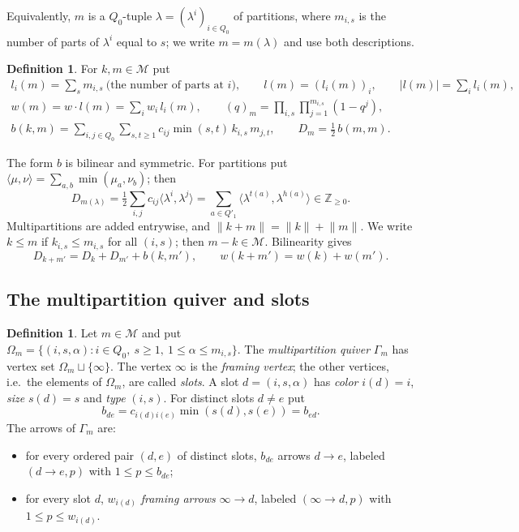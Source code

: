 \documentclass[11pt]{amsart}
\theoremstyle{definition}
\newtheorem{definition}[theorem]{Definition}
\theoremstyle{remark}
\numberwithin{equation}{section}
\newcommand{\Z}{\mathbb{Z}}
\newcommand{\cM}{\mathcal{M}}
\newcommand{\Om}{\Omega_m}
\newcommand{\norm}[1]{\lVert #1\rVert}
\begin{document}
Equivalently, $m$ is a $Q_0$-tuple $\lambda=(\lambda^i)_{i\in Q_0}$ of partitions, where $m_{i,s}$ is the
number of parts of $\lambda^i$ equal to $s$; we write $m=m(\lambda)$ and use both descriptions.

\begin{definition}\label{def:notation}
For $k,m\in\cM$ put
\begin{gather}
  l_i(m)=\textstyle\sum_s m_{i,s}\ \text{(the number of parts at $i$)},\qquad
  l(m)=(l_i(m))_i,\qquad |l(m)|=\textstyle\sum_i l_i(m),\label{eq:l}\\
  w(m)=w\cdot l(m)=\textstyle\sum_i w_i\,l_i(m),\qquad
  (q)_m=\prod_{i,s}\prod_{j=1}^{m_{i,s}}(1-q^j),\label{eq:qm}\\
  b(k,m)=\sum_{i,j\in Q_0}\sum_{s,t\ge1}c_{ij}\min(s,t)\,k_{i,s}\,m_{j,t},\qquad D_m=\tfrac12\,b(m,m).
  \label{eq:b}
\end{gather}
\end{definition}

The form $b$ is bilinear and symmetric. For partitions put $\langle\mu,\nu\rangle=\sum_{a,b}\min(\mu_a,\nu_b)$;
then
\begin{equation}\label{eq:Dm}
  D_{m(\lambda)}=\tfrac12\sum_{i,j}c_{ij}\langle\lambda^i,\lambda^j\rangle
  =\sum_{a\in Q'_1}\langle\lambda^{t(a)},\lambda^{h(a)}\rangle\in\Z_{\ge0}.
\end{equation}
Multipartitions are added entrywise, and $\norm{k+m}=\norm{k}+\norm{m}$. We write $k\le m$ if
$k_{i,s}\le m_{i,s}$ for all $(i,s)$; then $m-k\in\cM$. Bilinearity gives
\begin{equation}\label{eq:additivity}
  D_{k+m'}=D_k+D_{m'}+b(k,m'),\qquad w(k+m')=w(k)+w(m').
\end{equation}

\subsection{The multipartition quiver and slots}\label{subsec:Gamma}

\begin{definition}\label{def:Gamma}
Let $m\in\cM$ and put $\Om=\{(i,s,\alpha): i\in Q_0,\ s\ge1,\ 1\le\alpha\le m_{i,s}\}$. The
\emph{multipartition quiver} $\Gamma_m$ has vertex set $\Om\sqcup\{\infty\}$. The vertex $\infty$ is the
\emph{framing vertex}; the other vertices, i.e.\ the elements of $\Om$, are called \emph{slots}. A slot
$d=(i,s,\alpha)$ has \emph{color} $i(d)=i$, \emph{size} $s(d)=s$ and \emph{type} $(i,s)$. For distinct
slots $d\neq e$ put
\begin{equation}\label{eq:bde}
  b_{de}=c_{i(d)i(e)}\min(s(d),s(e))=b_{ed}.
\end{equation}
The arrows of $\Gamma_m$ are:
\begin{itemize}[leftmargin=2em]
\item for every ordered pair $(d,e)$ of distinct slots, $b_{de}$ arrows $d\to e$, labeled
$(d\to e,p)$ with $1\le p\le b_{de}$;
\item for every slot $d$, $w_{i(d)}$ \emph{framing arrows} $\infty\to d$, labeled $(\infty\to d,p)$ with
$1\le p\le w_{i(d)}$.
\end{itemize}
\end{definition}
\end{document}
